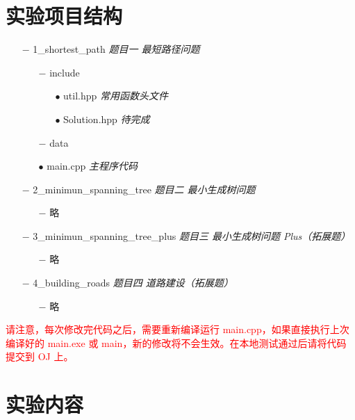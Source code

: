 \documentclass[12pt,a4paper]{article}
\begin{document}
\section{实验项目结构}

\begin{itemize}[noitemsep]
    \item[$-$] 1\_shortest\_path \textit{题目一 \hspace{0.1cm} 最短路径问题}
    \begin{itemize}[noitemsep]
        \item[$-$] include
        \begin{itemize}[noitemsep]
            \item[$\bullet$] util.hpp \textit{常用函数头文件}
            \item[$\bullet$] Solution.hpp \textit{待完成}
        \end{itemize}
        \item[$-$] data
        \item[$\bullet$] main.cpp \textit{主程序代码}
    \end{itemize}
    \item[$-$] 2\_minimun\_spanning\_tree \textit{题目二 \hspace{0.1cm} 最小生成树问题}
    \begin{itemize}[noitemsep]
        \item[$-$] 略
    \end{itemize}
    \item[$-$] 3\_minimun\_spanning\_tree\_plus \textit{题目三 \hspace{0.1cm} 最小生成树问题 Plus（拓展题）}
    \begin{itemize}[noitemsep]
        \item[$-$] 略
    \end{itemize}
    \item[$-$] 4\_building\_roads \textit{题目四 \hspace{0.1cm} 道路建设（拓展题）}
    \begin{itemize}[noitemsep]
        \item[$-$] 略
    \end{itemize}
\end{itemize}

\textcolor{red}{请注意，每次修改完代码之后，需要重新编译运行 main.cpp，如果直接执行上次编译好的 main.exe 或 main，新的修改将不会生效。在本地测试通过后请将代码提交到 OJ 上。}

\section{实验内容}
\end{document}
